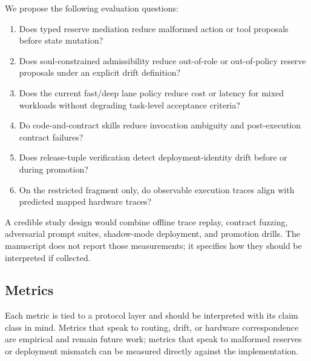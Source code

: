 \documentclass[11pt]{article}
\theoremstyle{remark}
\begin{document}
We propose the following evaluation questions:

\begin{enumerate}[label=\textbf{EQ\arabic*:}, leftmargin=2em]
  \item Does typed reserve mediation reduce malformed action or tool proposals before state mutation?
  \item Does soul-constrained admissibility reduce out-of-role or out-of-policy reserve proposals under an explicit drift definition?
  \item Does the current fast/deep lane policy reduce cost or latency for mixed workloads without degrading task-level acceptance criteria?
  \item Do code-and-contract skills reduce invocation ambiguity and post-execution contract failures?
  \item Does release-tuple verification detect deployment-identity drift before or during promotion?
  \item On the restricted fragment only, do observable execution traces align with predicted mapped hardware traces?
\end{enumerate}

A credible study design would combine offline trace replay, contract fuzzing, adversarial prompt suites, shadow-mode deployment, and promotion drills. The manuscript does not report those measurements; it specifies how they should be interpreted if collected.

\subsection{Metrics}

Each metric is tied to a protocol layer and should be interpreted with its claim class in mind. Metrics that speak to routing, drift, or hardware correspondence are empirical and remain future work; metrics that speak to malformed reserves or deployment mismatch can be measured directly against the implementation.
\end{document}
